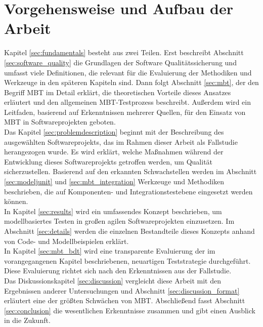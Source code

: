 \section{Vorgehensweise und Aufbau der Arbeit}
Kapitel \ref{sec:fundamentals}  besteht aus zwei Teilen. Erst beschreibt Abschnitt \ref{sec:software_quality} die Grundlagen der Software Qualitätssicherung und umfasst viele Definitionen, die relevant für die Evaluierung der Methodiken und Werkzeuge in den späteren Kapiteln sind. Dann folgt Abschnitt \ref{sec:mbt}, der den Begriff \Gls{MBT} im Detail erklärt, die theoretischen Vorteile dieses Ansatzes erläutert und den allgemeinen \Gls{MBT}-Testprozess beschreibt. Außerdem wird ein Leitfaden, basierend auf Erkenntnissen mehrerer Quellen, für den Einsatz von \Gls{MBT} in Softwareprojekten geboten.\\

Das Kapitel \ref{sec:problemdescription}  beginnt mit der Beschreibung des ausgewählten Softwareprojekts, das im Rahmen dieser Arbeit als Fallstudie herangezogen wurde. Es wird erklärt, welche Maßnahmen während der Entwicklung dieses Softwareprojekts getroffen werden, um Qualität sicherzustellen. Basierend auf den erkannten Schwachstellen werden im Abschnitt \ref{sec:modeljunit} und \ref{sec:mbt_integration} Werkzeuge und Methodiken beschrieben, die auf Komponenten- und Integrationstestebene eingesetzt werden können.\\

In Kapitel \ref{sec:results} wird ein umfassendes Konzept beschrieben, um modellbasiertes Testen in großen agilen Softwareprojekten einzusetzen. Im Abschnitt \ref{sec:details} werden die einzelnen Bestandteile dieses Konzepts anhand von Code- und Modellbeispielen erklärt.\\

In Kapitel \ref{sec:mbt_bdt} wird eine transparente Evaluierung der im vorangegangenen Kapitel beschriebenen, neuartigen Teststrategie durchgeführt. Diese Evaluierung richtet sich nach den Erkenntnissen aus der Fallstudie.\\    

Das Diskussionskapitel \ref{sec:discussion} vergleicht diese Arbeit mit den Ergebnissen anderer Untersuchungen und Abschnitt \ref{sec:discussion_format} erläutert eine der größten Schwächen von \Gls{MBT}. Abschließend fasst Abschnitt \ref{sec:conclusion} die wesentlichen Erkenntnisse zusammen und gibt einen Ausblick in die Zukunft.
